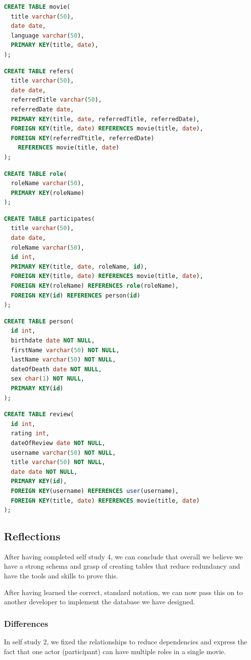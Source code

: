 \begin{lstlisting}[language=SQL]
CREATE TABLE movie(
  title varchar(50),
  date date,
  language varchar(50),
  PRIMARY KEY(title, date),
);
\end{lstlisting}

\begin{lstlisting}[language=SQL]
CREATE TABLE refers(
  title varchar(50),
  date date,
  referredTitle varchar(50),
  referredDate date,
  PRIMARY KEY(title, date, referredTitle, referredDate),
  FOREIGN KEY(title, date) REFERENCES movie(title, date),
  FOREIGN KEY(referredTtitle, referredDate)
    REFERENCES movie(title, date)
);
\end{lstlisting}

\begin{lstlisting}[language=SQL]
CREATE TABLE role(
  roleName varchar(50),
  PRIMARY KEY(roleName)
);
\end{lstlisting}

\begin{lstlisting}[language=SQL]
CREATE TABLE participates(
  title varchar(50),
  date date,
  roleName varchar(50),
  id int,
  PRIMARY KEY(title, date, roleName, id),
  FOREIGN KEY(title, date) REFERENCES movie(title, date),
  FOREIGN KEY(roleName) REFERENCES role(roleName),
  FOREIGN KEY(id) REFERENCES person(id)
);
\end{lstlisting}

\begin{lstlisting}[language=SQL]
CREATE TABLE person(
  id int,
  birthdate date NOT NULL,
  firstName varchar(50) NOT NULL,
  lastName varchar(50) NOT NULL,
  dateOfDeath date NOT NULL,
  sex char(1) NOT NULL,
  PRIMARY KEY(id)
);
\end{lstlisting}

\begin{lstlisting}[language=SQL]
CREATE TABLE review(
  id int,
  rating int,
  dateOfReview date NOT NULL,
  username varchar(50) NOT NULL,
  title varchar(50) NOT NULL,
  date date NOT NULL,
  PRIMARY KEY(id),
  FOREIGN KEY(username) REFERENCES user(username),
  FOREIGN KEY(title, date) REFERENCES movie(title, date)
);
\end{lstlisting}

\subsection{Reflections}
After having completed self study 4, we can conclude that overall we believe we have a strong schema and grasp of creating tables that reduce redundancy and have the tools and skills to prove this.

After having learned the correct, standard notation, we can now pass this on to another developer to implement the database we have designed.

\subsubsection{Differences}
In self study 2, we fixed the relationships to reduce dependencies and express the fact that one actor (participant) can have multiple roles in a single movie.
